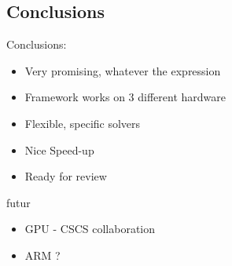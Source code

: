 \documentclass{beamer}
\begin{document}

%
%


\subsection*{Conclusions}
\begin{frame}[fragile]
Conclusions:
\begin{itemize}
\item Very promising, whatever the expression
\item Framework works on 3 different hardware
\item Flexible, specific solvers
\item Nice Speed-up
\item Ready for review 
\end{itemize}

futur

\begin{itemize}
\item GPU - CSCS collaboration 
\item ARM ?
\end{itemize}

\end{frame}
\end{document}
